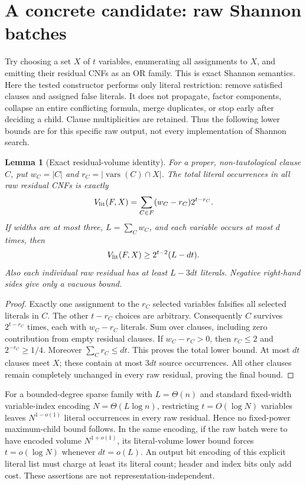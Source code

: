 \documentclass[11pt]{article}
\newtheorem{lemma}{Lemma}
\begin{document}
\section{A concrete candidate: raw Shannon batches}
Try choosing a set $X$ of $t$ variables, enumerating all assignments to
$X$, and emitting their residual CNFs as an OR family. This is exact
Shannon semantics. Here the tested constructor performs only literal
restriction: remove satisfied clauses and assigned false literals.
It does not propagate, factor components, collapse an entire conflicting
formula, merge duplicates, or stop early after deciding a child.
Clause multiplicities are retained. Thus the following lower bounds are
for this specific raw output, not every implementation of Shannon search.

\begin{lemma}[Exact residual-volume identity]
For a proper, non-tautological clause $C$, put $w_C=|C|$ and
$r_C=|\operatorname{vars}(C)\cap X|$. The total literal occurrences in
all raw residual CNFs is exactly
\[
 V_{\rm lit}(F,X)=\sum_{C\in F}(w_C-r_C)2^{t-r_C}.
\]
If widths are at most three, $L=\sum_Cw_C$, and each variable occurs at
most $d$ times, then
\[
 V_{\rm lit}(F,X)\ge 2^{t-2}(L-dt).
\]
Also each individual raw residual has at least $L-3dt$ literals.
Negative right-hand sides give only a vacuous bound.
\end{lemma}
\begin{proof}
Exactly one assignment to the $r_C$ selected variables falsifies all
selected literals in $C$. The other $t-r_C$ choices are arbitrary.
Consequently $C$ survives $2^{t-r_C}$ times, each with $w_C-r_C$
literals. Sum over clauses, including zero contribution from empty
residual clauses. If $w_C-r_C>0$, then $r_C\le2$ and
$2^{-r_C}\ge1/4$. Moreover $\sum_Cr_C\le dt$.
This proves the total lower bound. At most $dt$ clauses meet $X$;
these contain at most $3dt$ source occurrences. All other clauses
remain completely unchanged in every raw residual, proving the final
bound.
\end{proof}

For a bounded-degree sparse family with $L=\Theta(n)$ and standard
fixed-width variable-index encoding $N=\Theta(L\log n)$, restricting
$t=O(\log N)$ variables leaves $N^{1-o(1)}$ literal occurrences in
every raw residual. Hence no fixed-power maximum-child bound follows.
In the same encoding, if the raw batch were to have encoded volume
$N^{1+o(1)}$, its literal-volume lower bound forces
$t=o(\log N)$ whenever $dt=o(L)$. An output bit encoding of this explicit
literal list must charge at least its literal count; header and index
bits only add cost. These assertions are not representation-independent.
\end{document}
